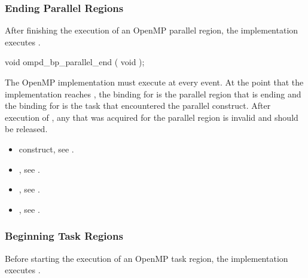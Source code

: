 \subsubsection{Ending Parallel Regions}
\label{subsubsec:ompd_bp_parallel_end}

\summary
After finishing the execution of an OpenMP parallel region, 
the implementation executes .

\format
\begin{cspecific}
\begin{ompSyntax}
void ompd_bp_parallel_end ( void );
\end{ompSyntax}
\end{cspecific}


\descr
The OpenMP implementation must execute  at 
every  event. At the point that the implementation reaches 
, the binding for  
is the parallel region that is ending and the binding for 
 is the task that encountered the 
parallel construct. After execution of , any 
 that was acquired for the parallel region is 
invalid and should be released.

\crossreferences
\begin{itemize}
\item {} construct, see .

\item {}, 
see .

\item {}, 
see .

\item {}, 
see .
\end{itemize}



\subsubsection{Beginning Task Regions}
\label{subsubsec:ompd_bp_task_begin}

\summary
Before starting the execution of an OpenMP task region, 
the implementation executes .

